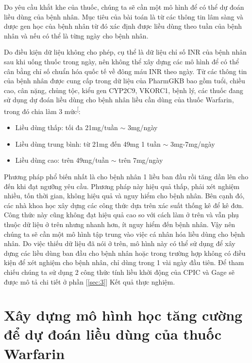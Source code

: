 \documentclass[14pt,oneside]{scrbook}
\providecommand{\tightlist}{\setlength{\itemsep}{\smallskipamount}\setlength{\parskip}{\smallskipamount}}
\begin{document}
Do yêu cầu khắt khe của thuốc, chúng ta sẽ cần một mô hình để có thể dự
đoán liều dùng của bệnh nhân. Mục tiêu của bài toán là từ các thông tin
lâm sàng và dược gen học của bệnh nhân từ đó xác định được liều dùng
theo tuần của bệnh nhân và nếu có thể là từng ngày cho bệnh nhân.

Do điều kiện dữ liệu không cho phép, cụ thể là dữ liệu chỉ số INR của
bệnh nhân sau khi uống thuốc trong ngày, nên không thể xây dựng các mô
hình để có thể cân bằng chỉ số chuẩn hóa quốc tế về đông máu INR theo
ngày. Từ các thông tin của bệnh nhân được cung cấp trong dữ liệu của
PharmGKB bao gồm tuổi, chiều cao, cân nặng, chủng tộc, kiểu gen CYP2C9,
VKORC1, bệnh lý, các thuốc đang sử dụng dự đoán liều dùng cho bệnh nhân
liều cần dùng của thuốc Warfarin, trong đó chia làm 3
mức\textsuperscript{{[}\citeproc{ref-base}{7}{]}}:

\begin{itemize}
\tightlist
\item
  Liều dùng thấp: tối đa 21mg/tuần \(\sim\) 3mg/ngày
\item
  Liều dùng trung bình: từ 21mg đến 49mg 1 tuần \(\sim\) 3mg-7mg/ngày
\item
  Liều dùng cao: trên 49mg/tuần \(\sim\) trên 7mg/ngày
\end{itemize}

Phương pháp phổ biến nhất là cho bệnh nhân 1 liều ban đầu rồi tăng dần
lên cho đến khi đạt ngưỡng yêu cầu. Phương pháp này hiệu quả thấp, phải
xét nghiệm nhiều, tốn thời gian, không hiệu quả và nguy hiểm cho bệnh
nhân. Bên cạnh đó, các nhà khoa học xây dựng các công thức dựa trên xác
suất thống kê để kê đơn. Công thức này cũng không đạt hiệu quả cao so
với cách làm ở trên và vẫn phụ thuộc dữ liệu ở trên nhưng nhanh hơn, ít
nguy hiểm đến bệnh nhân. Vậy nên chúng ta sẽ cần một mô hình tập trung
vào việc cá nhân hóa liều dùng cho bệnh nhân. Do việc thiếu dữ liệu đã
nói ở trên, mô hình này có thể sử dụng để xây dựng các liều dùng ban đầu
cho bệnh nhân hoặc trong trường hợp không có điều kiện để xét nghiệm cho
bệnh nhân, chỉ dùng trong 1 vài ngày đầu tiên. Để tham chiếu chúng ta sử
dụng 2 công thức tính liều khởi động của CPIC và Gage sẽ được mô tả chi
tiết ở phần {[}\ref{sec:3}{]} Kết quả thực nghiệm.

\chapter{Xây dựng mô hình học tăng cường để dự đoán liều dùng của thuốc
Warfarin}\label{xuxe2y-dux1ef1ng-muxf4-huxecnh-hux1ecdc-tux103ng-cux1b0ux1eddng-ux111ux1ec3-dux1ef1-ux111ouxe1n-liux1ec1u-duxf9ng-ban-ux111ux1ea7u-cux1ee7a-thuux1ed1c-warfarin}
\end{document}
